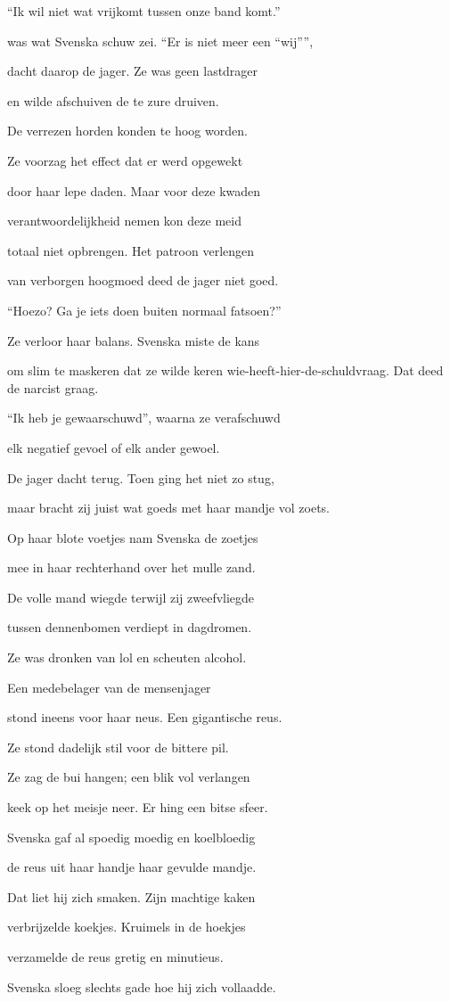 “Ik wil niet wat vrijkomt
tussen onze band komt.”

was wat Svenska schuw zei. “Er is niet meer een “wij””,

dacht daarop de jager.
Ze was geen lastdrager

en wilde afschuiven
de te zure druiven.

De verrezen horden
konden te hoog worden.

Ze voorzag het effect
dat er werd opgewekt

door haar lepe daden.
Maar voor deze kwaden

verantwoordelijkheid
nemen kon deze meid

totaal niet opbrengen.
Het patroon verlengen

van verborgen hoogmoed
deed de jager niet goed.

“Hoezo? Ga je iets doen
buiten normaal fatsoen?”

Ze verloor haar balans.
Svenska miste de kans

om slim te maskeren
dat ze wilde keren
wie-heeft-hier-de-schuldvraag.
Dat deed de narcist graag.

“Ik heb je gewaarschuwd”,
waarna ze verafschuwd

elk negatief gevoel
of elk ander gewoel.

De jager dacht terug.
Toen ging het niet zo stug,

maar bracht zij juist wat goeds met haar mandje vol zoets.

Op haar blote voetjes
nam Svenska de zoetjes

mee in haar rechterhand
over het mulle zand.

De volle mand wiegde
terwijl zij zweefvliegde

tussen dennenbomen
verdiept in dagdromen.

Ze was dronken van lol
en scheuten alcohol.

Een medebelager
van de mensenjager

stond ineens voor haar neus.
Een gigantische reus.

Ze stond dadelijk stil
voor de bittere pil.

Ze zag de bui hangen;
een blik vol verlangen

keek op het meisje neer.
Er hing een bitse sfeer.

Svenska gaf al spoedig
moedig en koelbloedig

de reus uit haar handje
haar gevulde mandje.

Dat liet hij zich smaken.
Zijn machtige kaken

verbrijzelde koekjes.
Kruimels in de hoekjes

verzamelde de reus
gretig en minutieus.

Svenska sloeg slechts gade
hoe hij zich vollaadde.
